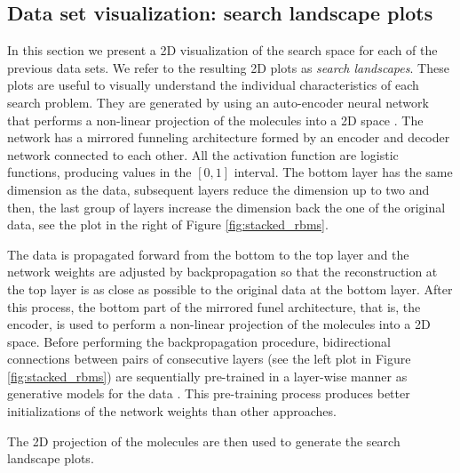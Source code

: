 \subsection{Data set visualization: search landscape plots}

In this section we present a 2D visualization of the search space for each of
the previous data sets. We refer to the resulting 2D plots as \emph{search
landscapes}. These plots are useful to visually understand the individual
characteristics of each search problem. They are generated by using an
auto-encoder neural network that performs a non-linear projection of the
molecules into a 2D space \cite{Hinton_2006}. The network has a mirrored
funneling architecture formed by an encoder and decoder network connected to
each other. All the activation function are
logistic functions, producing values in the $[0,1]$ interval.
The bottom layer has the same dimension as the data, subsequent
layers reduce the dimension up to two and then, the last group of layers
increase the dimension back the one of the original data, see the plot in the
right of Figure \ref{fig:stacked_rbms}. 

The data is propagated forward from the bottom to the top layer and the network
weights are adjusted by backpropagation so that the reconstruction at the top
layer is as close as possible to the original data at the bottom layer. After
this process, the bottom part of the mirrored funel architecture, that is, the
encoder, is used to perform a non-linear projection of the molecules into a 2D
space. Before performing the backpropagation procedure, bidirectional
connections between pairs of consecutive layers (see the left plot in Figure
\ref{fig:stacked_rbms}) are sequentially pre-trained in a layer-wise manner as
generative models for the data \cite{Hinton_2006}. This pre-training process
produces better initializations of the network weights than other approaches.

The 2D projection of the molecules are then used to generate the search
landscape plots.

